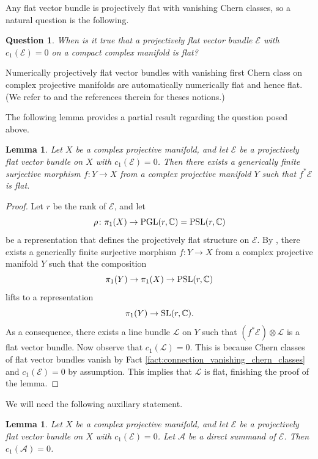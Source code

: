 \documentclass[english,10pt]{amsart}
\newcommand{\sA}{\mathscr{A}}
\newcommand{\sE}{\mathscr{E}}
\newcommand{\sL}{\mathscr{L}}
\newtheorem{question}[thm]{Question}
\newtheorem{lemma}[thm]{Lemma}
\theoremstyle{definition}
\theoremstyle{remark}
\numberwithin{equation}{section}
\begin{document}
\medskip

Any flat vector bundle is projectively flat with vanishing Chern classes, so a natural question is the following.

\begin{question}
When is it true that a projectively flat vector bundle $\sE$ with $c_1(\sE)=0$ on a compact complex manifold is flat?
\end{question}

Numerically projectively flat vector bundles with vanishing first Chern class on complex projective manifolds are automatically numerically flat and hence flat. (We refer to \cite{druel_IMJ} and the references therein for theses notions.) 

The following lemma provides a partial result regarding the question posed above.

\begin{lemma}\label{lemma:projectively_flat_versus_flat}
Let $X$ be a complex projective manifold, and let $\sE$ be a projectively flat vector bundle on $X$ with $c_1(\sE)=0$. Then there exists a generically finite surjective morphism $f \colon Y \to X$ from a complex projective manifold $Y$ such that $f^*\sE$ is flat.  
\end{lemma}

\begin{proof}Let $r$ be the rank of $\sE$, and let 
\[
\rho\colon \pi_1(X) \to \textup{PGL}(r,\mathbb{C})=\textup{PSL}(r,\mathbb{C})
\]
be a representation that defines the projectively flat structure on $\sE$. By \cite[Lemma 2.6]{langer_simpson}, there exists a generically finite surjective morphism $f \colon Y \to X$ from a complex projective manifold $Y$ such that the composition
\[
\pi_1(Y) \to \pi_1(X) \to \textup{PSL}(r,\mathbb{C})
\]
lifts to a representation
\[
\pi_1(Y) \to \textup{SL}(r,\mathbb{C}).
\]
As a consequence, there exists a line bundle $\sL$ on $Y$ such that $(f^*\sE)\otimes\sL$ is a flat vector bundle. Now observe that $c_1(\sL)=0$. This is because Chern classes of flat vector bundles vanish by Fact \ref{fact:connection_vanishing_chern_classes} and $c_1(\sE)=0$ by assumption. This implies that $\sL$ is flat, finishing the proof of the lemma.
\end{proof}

We will need the following auxiliary statement.


\begin{lemma}\label{lemma:first_chern_class_direct_summand}
Let $X$ be a complex projective manifold, and let $\sE$ be a projectively flat vector bundle on $X$ with $c_1(\sE)=0$. Let $\sA$ be a direct summand of $\sE$. Then $c_1(\sA)=0$.  
\end{lemma}
\end{document}
